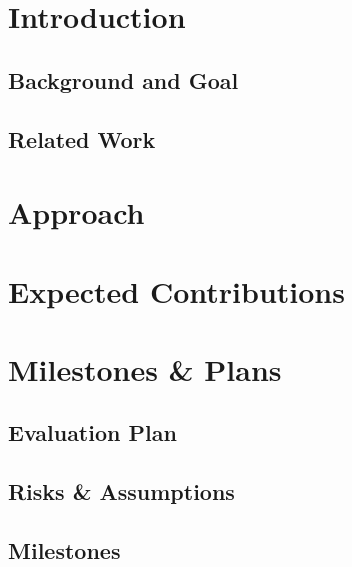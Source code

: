 \documentclass[10pt]{article}
\begin{document}
\maketitle

\section{Introduction}

\subsection{Background and Goal}

\subsection{Related Work}


\section{Approach}


\section{Expected Contributions}


\section{Milestones \& Plans}

\subsection{Evaluation Plan}


\subsection{Risks \& Assumptions}


\subsection{Milestones}




\end{document}
